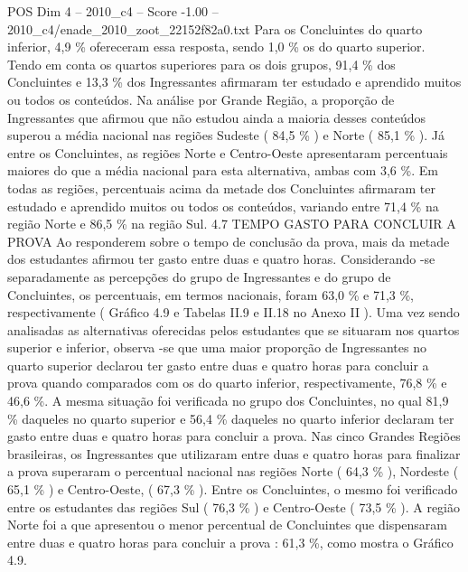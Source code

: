 \begin{textsample}{POS Dim 4 – 2010\_c4 – Score -1.00 – 2010\_c4/enade\_2010\_zoot\_22152f82a0.txt}
Para os Concluintes do quarto inferior, 4,9 \% ofereceram essa resposta, sendo 1,0 \% os do quarto superior.
Tendo em conta os quartos superiores para os dois grupos, 91,4 \% dos Concluintes e 13,3 \% dos Ingressantes afirmaram ter estudado e aprendido muitos ou todos os conteúdos.
Na análise por Grande Região, a proporção de Ingressantes que afirmou que não estudou ainda a maioria desses conteúdos superou a média nacional nas regiões Sudeste ( 84,5 \% ) e Norte ( 85,1 \% ).
Já entre os Concluintes, as regiões Norte e Centro-Oeste apresentaram percentuais maiores do que a média nacional para esta alternativa, ambas com 3,6 \%.
Em todas as regiões, percentuais acima da metade dos Concluintes afirmaram ter estudado e aprendido muitos ou todos os conteúdos, variando entre 71,4 \% na região Norte e 86,5 \% na região Sul. 4.7 TEMPO GASTO PARA CONCLUIR A PROVA Ao responderem sobre o tempo de conclusão da prova, mais da metade dos estudantes afirmou ter gasto entre duas e quatro horas.
Considerando -se separadamente as percepções do grupo de Ingressantes e do grupo de Concluintes, os percentuais, em termos nacionais, foram 63,0 \% e 71,3 \%, respectivamente ( Gráfico 4.9 e Tabelas II.9 e II.18 no Anexo II ).
Uma vez sendo analisadas as alternativas oferecidas pelos estudantes que se situaram nos quartos superior e inferior, observa -se que uma maior proporção de Ingressantes no quarto superior declarou ter gasto entre duas e quatro horas para concluir a prova quando comparados com os do quarto inferior, respectivamente, 76,8 \% e 46,6 \%.
A mesma situação foi verificada no grupo dos Concluintes, no qual 81,9 \% daqueles no quarto superior e 56,4 \% daqueles no quarto inferior declaram ter gasto entre duas e quatro horas para concluir a prova.
Nas cinco Grandes Regiões brasileiras, os Ingressantes que utilizaram entre duas e quatro horas para finalizar a prova superaram o percentual nacional nas regiões Norte ( 64,3 \% ), Nordeste ( 65,1 \% ) e Centro-Oeste, ( 67,3 \% ).
Entre os Concluintes, o mesmo foi verificado entre os estudantes das regiões Sul ( 76,3 \% ) e Centro-Oeste ( 73,5 \% ).
A região Norte foi a que apresentou o menor percentual de Concluintes que dispensaram entre duas e quatro horas para concluir a prova : 61,3 \%, como mostra o Gráfico 4.9.

\end{textsample}

